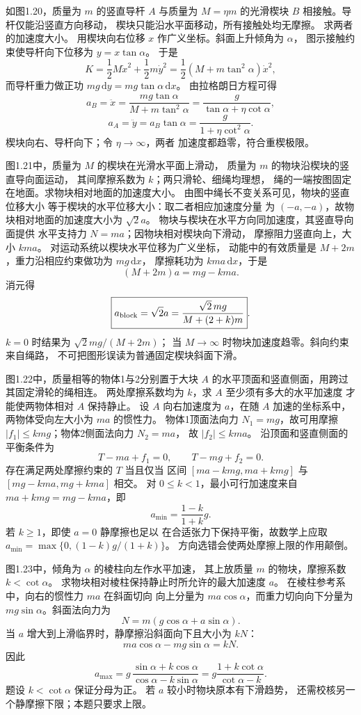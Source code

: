 如图1.20，质量为 $m$ 的竖直导杆 $A$ 与质量为
$M=\eta m$ 的光滑楔块 $B$ 相接触。导杆仅能沿竖直方向移动，
楔块只能沿水平面移动，所有接触处均无摩擦。
求两者的加速度大小。
\exsolution
用楔块向右位移 $x$ 作广义坐标。斜面上升倾角为 $\alpha$，
图示接触约束使导杆向下位移为 $y=x\tan\alpha$。
于是
\[
K=\frac12M\dot x^2+\frac12m\dot y^2
=\frac12(M+m\tan^2\alpha)\dot x^2,
\]
而导杆重力做正功 $mg\,\mathrm dy=mg\tan\alpha\,\mathrm dx$。
由拉格朗日方程可得
\[
a_B=\ddot x=\frac{mg\tan\alpha}{M+m\tan^2\alpha}
=\boxed{\frac{g}{\tan\alpha+\eta\cot\alpha}},
\]
\[
a_A=\ddot y=a_B\tan\alpha
=\boxed{\frac{g}{1+\eta\cot^2\alpha}}.
\]
\excheck 楔块向右、导杆向下；令 $\eta\to\infty$，两者
加速度都趋零，符合重楔极限。

图1.21中，质量为 $M$ 的楔块在光滑水平面上滑动，
质量为 $m$ 的物块沿楔块的竖直导向面运动，
其间摩擦系数为 $k$；两只滑轮、细绳均理想，
绳的一端按图固定在地面。求物块相对地面的加速度大小。
\exsolution
由图中绳长不变关系可见，物块的竖直位移大小
等于楔块的水平位移大小：取二者相应加速度分量
为 $(-a,-a)$，故物块相对地面的加速度大小为 $\sqrt2a$。
物块与楔块在水平方向同加速度，其竖直导向面提供
水平支持力 $N=ma$；因物块相对楔块向下滑动，
摩擦阻力竖直向上，大小 $kma$。
对运动系统以楔块水平位移为广义坐标，
动能中的有效质量是 $M+2m$，重力沿相应约束做功为 $mg\,\mathrm dx$，
摩擦耗功为 $kma\,\mathrm dx$，于是
\[
(M+2m)a=mg-kma.
\]
消元得
\[
\boxed{a_{\rm block}=\sqrt2 a
=\frac{\sqrt2\,mg}{M+(2+k)m}}.
\]
\excheck $k=0$ 时结果为 $\sqrt2mg/(M+2m)$；
当 $M\to\infty$ 时物块加速度趋零。斜向约束来自绳路，
不可把图形误读为普通固定楔块斜面下滑。

图1.22中，质量相等的物体1与2分别置于大块 $A$
的水平顶面和竖直侧面，用跨过其固定滑轮的绳相连。
两处摩擦系数均为 $k$，求 $A$ 至少须有多大的水平加速度
才能使两物体相对 $A$ 保持静止。
\exsolution
设 $A$ 向右加速度为 $a$，在随 $A$ 加速的坐标系中，
两物体受向左大小为 $ma$ 的惯性力。
物体1顶面法向力 $N_1=mg$，故可用摩擦
$|f_1|\le kmg$；物体2侧面法向力 $N_2=ma$，
故 $|f_2|\le kma$。
沿顶面和竖直侧面的平衡条件为
\[
T-ma+f_1=0,\qquad T-mg+f_2=0 .
\]
存在满足两处摩擦约束的 $T$ 当且仅当
区间 $[ma-kmg,ma+kmg]$ 与
$[mg-kma,mg+kma]$ 相交。
对 $0\le k<1$，最小可行加速度来自
$ma+kmg=mg-kma$，即
\[
\boxed{a_{\min}=\frac{1-k}{1+k}g}.
\]
\excheck 若 $k\ge1$，即使 $a=0$ 静摩擦也足以
在合适张力下保持平衡，故数学上应取
$a_{\min}=\max\{0,(1-k)g/(1+k)\}$。
方向选错会使两处摩擦上限的作用颠倒。

图1.23中，倾角为 $\alpha$ 的棱柱向左作水平加速，
其上放质量 $m$ 的物块，摩擦系数 $k<\cot\alpha$。
求物块相对棱柱保持静止时所允许的最大加速度 $a$。
\exsolution
在棱柱参考系中，向右的惯性力 $ma$ 在斜面切向
向上分量为 $ma\cos\alpha$，而重力切向向下分量为
$mg\sin\alpha$。斜面法向力为
\[
N=m(g\cos\alpha+a\sin\alpha).
\]
当 $a$ 增大到上滑临界时，静摩擦沿斜面向下且大小为 $kN$：
\[
ma\cos\alpha-mg\sin\alpha=kN.
\]
因此
\[
\boxed{a_{\max}
=g\,\frac{\sin\alpha+k\cos\alpha}
{\cos\alpha-k\sin\alpha}
=g\frac{1+k\cot\alpha}{\cot\alpha-k}}.
\]
\excheck 题设 $k<\cot\alpha$ 保证分母为正。
若 $a$ 较小时物块原本有下滑趋势，
还需校核另一个静摩擦下限；本题只要求上限。

